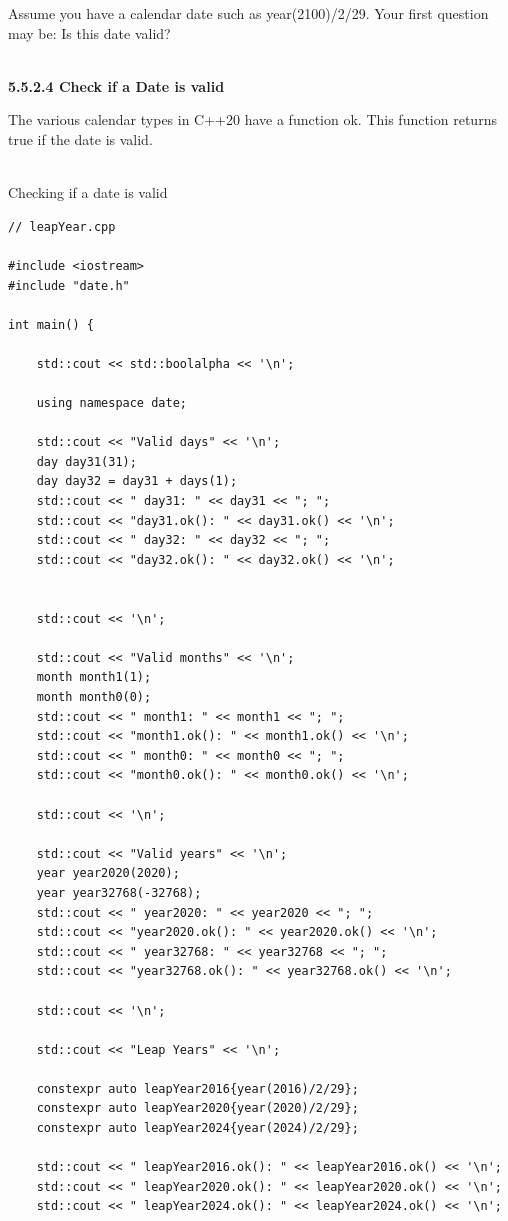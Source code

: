 Assume you have a calendar date such as year(2100)/2/29. Your first question may be: Is this date valid?

\hspace*{\fill} \\ %
\noindent
\textbf{5.5.2.4\hspace{0.2cm} Check if a Date is valid}

The various calendar types in C++20 have a function ok. This function returns true if the date is valid.

\hspace*{\fill} \\ %
\noindent
Checking if a date is valid
\begin{lstlisting}[style=styleCXX]
// leapYear.cpp

#include <iostream>
#include "date.h"

int main() {
	
	std::cout << std::boolalpha << '\n';
	
	using namespace date;
	
	std::cout << "Valid days" << '\n';
	day day31(31);
	day day32 = day31 + days(1);
	std::cout << " day31: " << day31 << "; ";
	std::cout << "day31.ok(): " << day31.ok() << '\n';
	std::cout << " day32: " << day32 << "; ";
	std::cout << "day32.ok(): " << day32.ok() << '\n';
	
	
	std::cout << '\n';
	
	std::cout << "Valid months" << '\n';
	month month1(1);
	month month0(0);
	std::cout << " month1: " << month1 << "; ";
	std::cout << "month1.ok(): " << month1.ok() << '\n';
	std::cout << " month0: " << month0 << "; ";
	std::cout << "month0.ok(): " << month0.ok() << '\n';
	
	std::cout << '\n';
	
	std::cout << "Valid years" << '\n';
	year year2020(2020);
	year year32768(-32768);
	std::cout << " year2020: " << year2020 << "; ";
	std::cout << "year2020.ok(): " << year2020.ok() << '\n';
	std::cout << " year32768: " << year32768 << "; ";
	std::cout << "year32768.ok(): " << year32768.ok() << '\n';
	
	std::cout << '\n';
	
	std::cout << "Leap Years" << '\n';
	
	constexpr auto leapYear2016{year(2016)/2/29};
	constexpr auto leapYear2020{year(2020)/2/29};
	constexpr auto leapYear2024{year(2024)/2/29};
	
	std::cout << " leapYear2016.ok(): " << leapYear2016.ok() << '\n';
	std::cout << " leapYear2020.ok(): " << leapYear2020.ok() << '\n';
	std::cout << " leapYear2024.ok(): " << leapYear2024.ok() << '\n';
	

\end{lstlisting}
